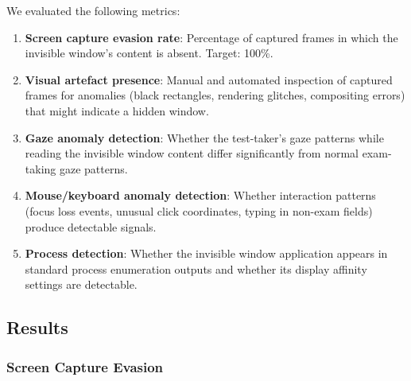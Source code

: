 \documentclass[conference]{IEEEtran}
\begin{document}
We evaluated the following metrics:

\begin{enumerate}
\item \textbf{Screen capture evasion rate}: Percentage of captured frames in which the invisible window's content is absent. Target: 100\%.

\item \textbf{Visual artefact presence}: Manual and automated inspection of captured frames for anomalies (black rectangles, rendering glitches, compositing errors) that might indicate a hidden window.

\item \textbf{Gaze anomaly detection}: Whether the test-taker's gaze patterns while reading the invisible window content differ significantly from normal exam-taking gaze patterns.

\item \textbf{Mouse/keyboard anomaly detection}: Whether interaction patterns (focus loss events, unusual click coordinates, typing in non-exam fields) produce detectable signals.

\item \textbf{Process detection}: Whether the invisible window application appears in standard process enumeration outputs and whether its display affinity settings are detectable.
\end{enumerate}

\subsection{Results}

\subsubsection{Screen Capture Evasion}
\end{document}
